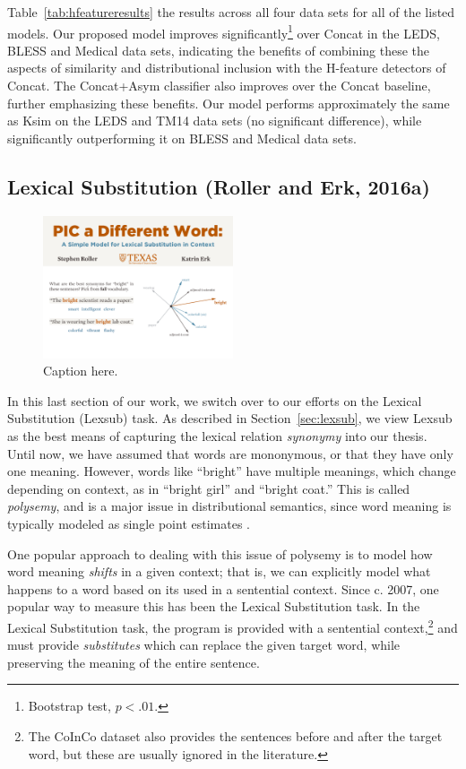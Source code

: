 \documentclass[12pt]{article}
\begin{document}
Table~\ref{tab:hfeatureresults} the results across all four data sets for all
of the listed models. Our proposed model improves
significantly\footnote{Bootstrap test, $p<.01$.} over Concat in the LEDS, BLESS
and Medical data sets, indicating the benefits of combining these the aspects
of similarity and distributional inclusion with the H-feature detectors of
Concat.  The Concat+Asym classifier also improves over the Concat baseline,
further emphasizing these benefits. Our model performs approximately the same
as Ksim on the LEDS and TM14 data sets (no significant difference), while
significantly outperforming it on BLESS and Medical data sets.



\subsection{Lexical Substitution (Roller and Erk, 2016a)}
\label{sec:pic}

\begin{figure}
  \centering
  \includegraphics[width=0.5\textwidth]{figures/substitution}
  \caption{Caption here.}
  \label{fig:substitution}
\end{figure}

In this last section of our work, we switch over to our efforts on the Lexical
Substitution (Lexsub) task. As described in Section~\ref{sec:lexsub}, we view
Lexsub as the best means of capturing the lexical relation {\em synonymy} into
our thesis. Until now, we have assumed that words are mononymous, or that they
have only one meaning. However, words like ``bright'' have multiple meanings,
which change depending on context, as in ``bright girl'' and ``bright coat.''
This is called {\em polysemy}, and is a major issue in distributional
semantics, since word meaning is typically modeled as single point
estimates .

One popular approach to dealing with this issue of polysemy is to model how
word meaning {\em shifts} in a given context; that is, we can explicitly
model what happens to a word based on its used in a sentential context. Since
c. 2007, one popular way to measure this has been the Lexical Substitution
task. In the Lexical Substitution task, the program is provided with a sentential
context,\footnote{The CoInCo dataset also provides the sentences before and after
the target word, but these are usually ignored in the literature.} and must
provide {\em substitutes} which can replace the given target word, while
preserving the meaning of the entire sentence.
\end{document}
